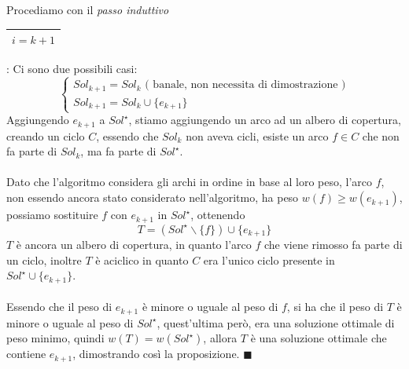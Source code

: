 \documentclass[12pt, letterpaper]{article}
\newcommand{\acc}{\\\hphantom{}\\}
\newcommand{\boxedMath}[1]{\begin{tabular}{|c|}\hline \texttt{#1} \\ \hline\end{tabular} :}
\begin{document}
Procediamo con il \textit{passo induttivo} \boxedMath{$i=k+1$} Ci sono due possibili casi:
 $$\begin{cases}
    Sol_{k+1}=Sol_k \text{ ( banale, non necessita di dimostrazione )}\\ 
    Sol_{k+1}=Sol_k \cup \{e_{k+1}\}
\end{cases}$$ 
Aggiungendo $e_{k+1}$ a $Sol^\star$, stiamo aggiungendo un arco ad un albero di copertura, creando un ciclo $C$, essendo che 
$Sol_k$ non aveva cicli, esiste un arco $f \in C$ che non fa parte di $Sol_k$, ma fa parte di $Sol^\star$.\acc 
Dato che l'algoritmo considera gli archi in ordine in base al loro peso, l'arco $f$, non essendo ancora stato considerato 
nell'algoritmo, ha peso $w(f)\ge w(e_{k+1})$, possiamo sostituire $f$ con $e_{k+1}$ in $Sol^\star$, ottenendo 
$$ T=(Sol^\star \backslash \{f\})\cup \{e_{k+1}\}$$
$T$ è ancora un albero di copertura, in quanto l'arco $f$ che viene rimosso fa parte di un ciclo, inoltre $T$ è aciclico 
in quanto $C$ era l'unico ciclo presente in $Sol^\star \cup  \{e_{k+1}\}$.\acc 
Essendo che il peso di $e_{k+1}$ è minore o uguale al peso di $f$, si ha che il peso di $T$ è minore o uguale 
al peso di $Sol^\star$, quest'ultima però, era una soluzione ottimale di peso minimo, quindi $w(T)=w(Sol^\star)$, allora 
$T$ è una soluzione ottimale che contiene $e_{k+1}$, dimostrando così la proposizione. $\blacksquare$
\end{document}
